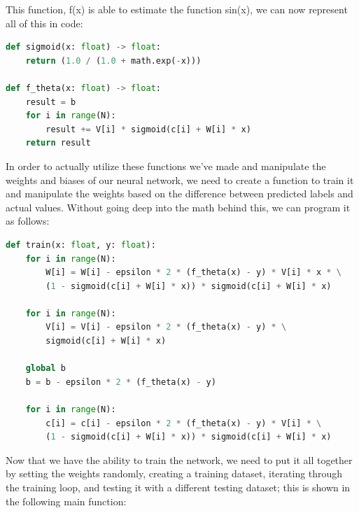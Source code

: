 \documentclass[12pt, letter]{article}
\begin{document}
 
\noindent This function, f(x) is able to estimate the function sin(x), we can now represent all of this in code:

\begin{lstlisting}[language=Python]
def sigmoid(x: float) -> float:
    return (1.0 / (1.0 + math.exp(-x)))

def f_theta(x: float) -> float:
    result = b
    for i in range(N):
        result += V[i] * sigmoid(c[i] + W[i] * x)
    return result
\end{lstlisting}

In order to actually utilize these functions we’ve made and manipulate the weights and biases of our neural network, we need to create a function to train it and manipulate the weights based on the difference between predicted labels and actual values. Without going deep into the math behind this, we can program it as follows:

\begin{lstlisting}[language=Python]
def train(x: float, y: float):
    for i in range(N):
        W[i] = W[i] - epsilon * 2 * (f_theta(x) - y) * V[i] * x * \
        (1 - sigmoid(c[i] + W[i] * x)) * sigmoid(c[i] + W[i] * x)
    
    for i in range(N):
        V[i] = V[i] - epsilon * 2 * (f_theta(x) - y) * \
        sigmoid(c[i] + W[i] * x)

    global b
    b = b - epsilon * 2 * (f_theta(x) - y)

    for i in range(N):
        c[i] = c[i] - epsilon * 2 * (f_theta(x) - y) * V[i] * \
        (1 - sigmoid(c[i] + W[i] * x)) * sigmoid(c[i] + W[i] * x)

\end{lstlisting}

Now that we have the ability to train the network, we need to put it all together by setting the weights randomly, creating a training dataset, iterating through the training loop, and testing it with a different testing dataset; this is shown in the following main function:
\end{document}
